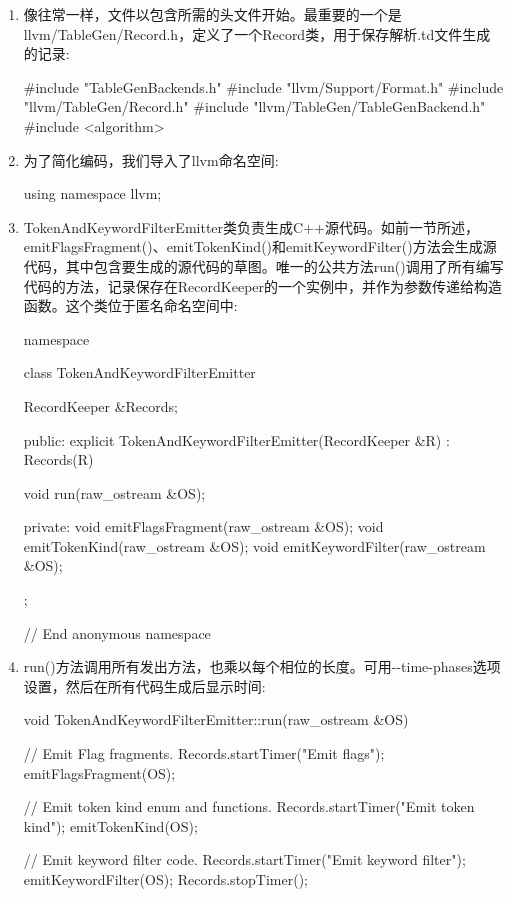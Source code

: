 \begin{enumerate}
\item
像往常一样，文件以包含所需的头文件开始。最重要的一个是llvm/TableGen/Record.h，定义了一个Record类，用于保存解析.td文件生成的记录:

\begin{cpp}
#include "TableGenBackends.h"
#include "llvm/Support/Format.h"
#include "llvm/TableGen/Record.h"
#include "llvm/TableGen/TableGenBackend.h"
#include <algorithm>
\end{cpp}

\item
为了简化编码，我们导入了llvm命名空间:

\begin{cpp}
using namespace llvm;
\end{cpp}

\item
TokenAndKeywordFilterEmitter类负责生成C++源代码。如前一节所述，emitFlagsFragment()、emitTokenKind()和emitKeywordFilter()方法会生成源代码，其中包含要生成的源代码的草图。唯一的公共方法run()调用了所有编写代码的方法，记录保存在RecordKeeper的一个实例中，并作为参数传递给构造函数。这个类位于匿名命名空间中:

\begin{cpp}
namespace {
class TokenAndKeywordFilterEmitter {
    RecordKeeper &Records;

public:
    explicit TokenAndKeywordFilterEmitter(RecordKeeper &R)
        : Records(R) {}

    void run(raw_ostream &OS);

private:
    void emitFlagsFragment(raw_ostream &OS);
    void emitTokenKind(raw_ostream &OS);
    void emitKeywordFilter(raw_ostream &OS);
};
} // End anonymous namespace
\end{cpp}

\item
run()方法调用所有发出方法，也乘以每个相位的长度。可用-{}-time-phases选项设置，然后在所有代码生成后显示时间:

\begin{cpp}
void TokenAndKeywordFilterEmitter::run(raw_ostream &OS) {
    // Emit Flag fragments.
    Records.startTimer("Emit flags");
    emitFlagsFragment(OS);

    // Emit token kind enum and functions.
    Records.startTimer("Emit token kind");
    emitTokenKind(OS);

    // Emit keyword filter code.
    Records.startTimer("Emit keyword filter");
    emitKeywordFilter(OS);
    Records.stopTimer();
}
\end{cpp}


\end{enumerate}
